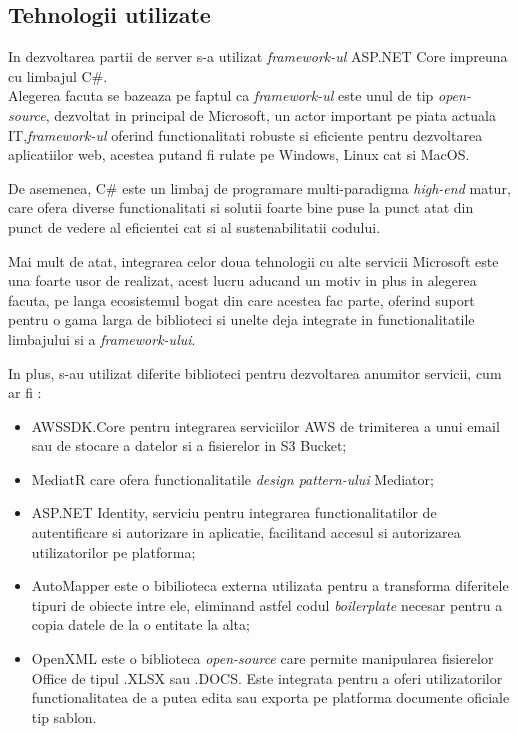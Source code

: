 	
 

\subsection*{Tehnologii utilizate}
In dezvoltarea partii de server s-a utilizat \textit{framework-ul } ASP.NET Core impreuna cu limbajul C\#.\\
Alegerea facuta se bazeaza pe faptul ca \textit{framework-ul} este unul de tip \textit{open-source}, dezvoltat in principal de Microsoft, un actor important pe piata actuala IT,\textit{framework-ul} oferind functionalitati robuste si eficiente pentru dezvoltarea aplicatiilor web, acestea putand fi rulate pe Windows, Linux cat si MacOS.

De asemenea, C\# este un limbaj de programare multi-paradigma \textit{high-end} matur, care ofera diverse functionalitati si solutii foarte bine puse la punct atat din punct de vedere al eficientei cat si al sustenabilitatii codului.

Mai mult de atat, integrarea celor doua tehnologii cu alte servicii Microsoft este una foarte usor de realizat, acest lucru aducand un motiv in plus in alegerea facuta, pe langa ecosistemul bogat din care acestea fac parte, oferind suport pentru o gama larga de biblioteci si unelte deja integrate in functionalitatile limbajului si a \textit{framework-ului}.

In plus, s-au utilizat diferite biblioteci pentru dezvoltarea anumitor servicii, cum ar fi :
\begin{itemize}
	\item  AWSSDK.Core pentru integrarea serviciilor AWS de trimiterea a unui email sau de stocare a datelor si a fisierelor in S3 Bucket;
	
	\item  MediatR care ofera functionalitatile \textit{design pattern-ului} Mediator;
	
	\item ASP.NET Identity, serviciu pentru integrarea functionalitatilor de autentificare si autorizare in aplicatie, facilitand accesul si autorizarea utilizatorilor pe platforma;
	
	
	\item AutoMapper este o bibilioteca externa utilizata pentru a transforma diferitele tipuri de obiecte intre ele, eliminand astfel codul \textit{boilerplate} necesar pentru a copia datele de la  o entitate la alta;
	
	\item OpenXML este o biblioteca \textit{open-source} care permite manipularea fisierelor Office de tipul .XLSX sau .DOCS. Este integrata pentru a oferi utilizatorilor functionalitatea de a putea edita sau exporta pe platforma documente oficiale tip sablon.
	
\end{itemize}
   

